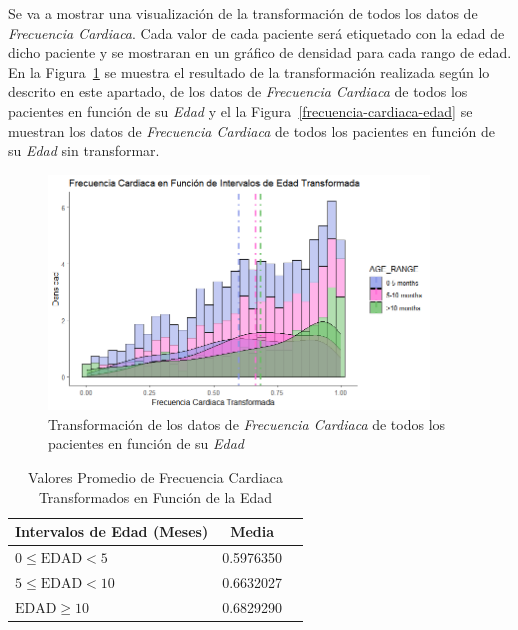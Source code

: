 Se va a mostrar una visualización de la transformación de todos los datos de \textit{Frecuencia Cardiaca}. Cada valor de cada paciente será etiquetado con la edad de dicho paciente y se mostraran en un gráfico de densidad para cada rango de edad. En la Figura~\ref{fig:transformacion-frecuencia-cardiaca-edad} se muestra el resultado de la transformación realizada según lo descrito en este apartado, de los datos de \textit{Frecuencia Cardiaca} de todos los pacientes en función de su \textit{Edad} y el la Figura~\ref{frecuencia-cardiaca-edad} se muestran los datos de \textit{Frecuencia Cardiaca} de todos los pacientes en función de su \textit{Edad} sin transformar.

\begin{figure}[H]
    \centering
    \includegraphics[width=0.9\textwidth]{img/transformacion-frecuencia-cardiaca-edad.png}
    \caption{Transformación de los datos de \textit{Frecuencia Cardiaca} de todos los pacientes en función de su \textit{Edad}}
    \label{fig:transformacion-frecuencia-cardiaca-edad}
\end{figure}

\begin{table}[H]
    \centering
    \begin{tabular}{lcc}
        \toprule
        \textbf{Intervalos de Edad (Meses)} & \textbf{Media} \\
        \midrule
        $0 \leq \text{EDAD} < 5$ & 0.5976350 \\
        $5 \leq \text{EDAD} < 10$ & 0.6632027 \\
        $\text{EDAD} \geq 10$ & 0.6829290 \\
        \bottomrule
    \end{tabular}
    \caption{Valores Promedio de Frecuencia Cardiaca Transformados en Función de la Edad}\label{tabla:frecuencia-cardiaca-edad-transformada}
\end{table}

